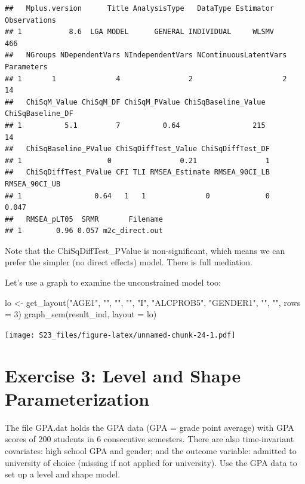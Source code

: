\documentclass[
]{book}
\newenvironment{Shaded}{\begin{snugshade}}{\end{snugshade}}
\newcommand{\AttributeTok}[1]{\textcolor[rgb]{0.77,0.63,0.00}{#1}}
\newcommand{\DecValTok}[1]{\textcolor[rgb]{0.00,0.00,0.81}{#1}}
\newcommand{\FunctionTok}[1]{\textcolor[rgb]{0.00,0.00,0.00}{#1}}
\newcommand{\NormalTok}[1]{#1}
\newcommand{\OtherTok}[1]{\textcolor[rgb]{0.56,0.35,0.01}{#1}}
\newcommand{\StringTok}[1]{\textcolor[rgb]{0.31,0.60,0.02}{#1}}
\begin{document}
\begin{verbatim}
##   Mplus.version      Title AnalysisType   DataType Estimator Observations
## 1           8.6  LGA MODEL      GENERAL INDIVIDUAL     WLSMV          466
##   NGroups NDependentVars NIndependentVars NContinuousLatentVars Parameters
## 1       1              4                2                     2         14
##   ChiSqM_Value ChiSqM_DF ChiSqM_PValue ChiSqBaseline_Value ChiSqBaseline_DF
## 1          5.1         7          0.64                 215               14
##   ChiSqBaseline_PValue ChiSqDiffTest_Value ChiSqDiffTest_DF
## 1                    0                0.21                1
##   ChiSqDiffTest_PValue CFI TLI RMSEA_Estimate RMSEA_90CI_LB RMSEA_90CI_UB
## 1                 0.64   1   1              0             0         0.047
##   RMSEA_pLT05  SRMR       Filename
## 1        0.96 0.057 m2c_direct.out
\end{verbatim}

Note that the ChiSqDiffTest\_PValue is non-significant, which means we can
prefer the simpler (no direct effects) model. There is full mediation.

Let's use a graph to examine the unconstrained model too:

\begin{Shaded}
\begin{Highlighting}[]
\NormalTok{lo }\OtherTok{\textless{}{-}} \FunctionTok{get\_layout}\NormalTok{(}\StringTok{"AGE1"}\NormalTok{,    }\StringTok{""}\NormalTok{, }\StringTok{""}\NormalTok{,}
                 \StringTok{""}\NormalTok{,        }\StringTok{"I"}\NormalTok{,  }\StringTok{"ALCPROB5"}\NormalTok{,}
                 \StringTok{"GENDER1"}\NormalTok{, }\StringTok{""}\NormalTok{, }\StringTok{""}\NormalTok{, }\AttributeTok{rows =} \DecValTok{3}\NormalTok{)}
\FunctionTok{graph\_sem}\NormalTok{(result\_ind, }\AttributeTok{layout =}\NormalTok{ lo)}
\end{Highlighting}
\end{Shaded}

\texttt{[image: S23\_files/figure-latex/unnamed-chunk-24-1.pdf]}

\hypertarget{exercise-3-level-and-shape-parameterization}{%
\section{Exercise 3: Level and Shape Parameterization}\label{exercise-3-level-and-shape-parameterization}}

The file GPA.dat holds the GPA data (GPA = grade point average) with GPA scores of 200 students in 6 consecutive
semesters. There are also time-invariant covariates: high school GPA and gender; and the outcome variable:
admitted to university of choice (missing if not applied for university). Use the GPA data to set up a level and shape
model.
\end{document}
